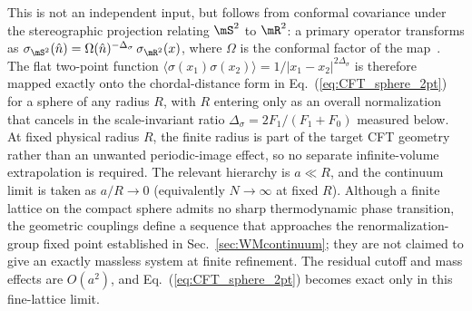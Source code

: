 \begingroup\color{violet}
This is not an independent input, but follows from conformal covariance
under the stereographic projection relating $\mS^2$ to $\mR^2$: a primary
operator transforms as
$\sigma_{\mS^2}(\hat n) = \Omega(\hat n)^{-\Delta_\sigma}\, \sigma_{\mR^2}(x)$,
where $\Omega$ is the conformal factor of the map~\cite{Rychkov:2016iqz}.
The flat two-point function
$\langle \sigma(x_1) \sigma(x_2) \rangle = 1/|x_1 - x_2|^{2\Delta_\sigma}$ is
therefore mapped exactly onto the chordal-distance form in
Eq.~(\ref{eq:CFT_sphere_2pt}) for a sphere of any radius $R$, with $R$
entering only as an overall normalization that cancels in the
scale-invariant ratio $\Delta_\sigma = 2 F_1/(F_1 + F_0)$ measured below.
At fixed physical radius $R$, the finite radius is part of the target CFT
geometry rather than an unwanted periodic-image effect, so no separate
infinite-volume extrapolation is required.  The relevant hierarchy is
$a\ll R$, and the continuum limit is taken as $a/R\rightarrow0$ (equivalently
$N\rightarrow\infty$ at fixed $R$).  Although a finite lattice on the compact
sphere admits no sharp thermodynamic phase transition, the geometric
couplings define a sequence that approaches the renormalization-group fixed
point established in Sec.~\ref{sec:WMcontinuum}; they are not claimed to give
an exactly massless system at finite refinement.  The residual cutoff and
mass effects are $O(a^2)$, and Eq.~(\ref{eq:CFT_sphere_2pt}) becomes exact only
in this fine-lattice limit.
\endgroup

